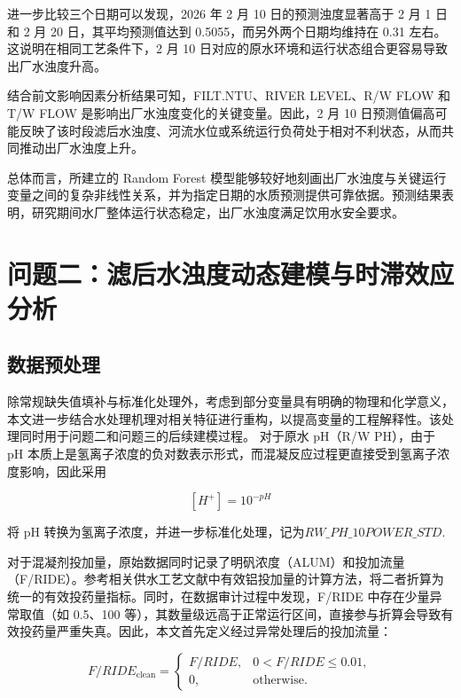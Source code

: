 \documentclass[UTF8,zihao=-4]{ctexart}
\begin{document}
进一步比较三个日期可以发现，2026 年 2 月 10 日的预测浊度显著高于 2 月 1 日和 2 月 20 日，其平均预测值达到 0.5055，而另外两个日期均维持在 0.31 左右。这说明在相同工艺条件下，2 月 10 日对应的原水环境和运行状态组合更容易导致出厂水浊度升高。

结合前文影响因素分析结果可知，FILT.NTU、RIVER LEVEL、R/W FLOW 和 T/W FLOW 是影响出厂水浊度变化的关键变量。因此，2 月 10 日预测值偏高可能反映了该时段滤后水浊度、河流水位或系统运行负荷处于相对不利状态，从而共同推动出厂水浊度上升。

总体而言，所建立的 Random Forest 模型能够较好地刻画出厂水浊度与关键运行变量之间的复杂非线性关系，并为指定日期的水质预测提供可靠依据。预测结果表明，研究期间水厂整体运行状态稳定，出厂水浊度满足饮用水安全要求。

\section{问题二：滤后水浊度动态建模与时滞效应分析}

\subsection{数据预处理}

除常规缺失值填补与标准化处理外，考虑到部分变量具有明确的物理和化学意义，本文进一步结合水处理机理对相关特征进行重构，以提高变量的工程解释性。该处理同时用于问题二和问题三的后续建模过程。
对于原水 pH（R/W PH），由于 pH 本质上是氢离子浓度的负对数表示形式，而混凝反应过程更直接受到氢离子浓度影响，因此采用

\[
[H^+]=10^{-pH}
\]

将 pH 转换为氢离子浓度，并进一步标准化处理，记为$RW\_PH\_{10POWER\_STD}$.



对于混凝剂投加量，原始数据同时记录了明矾浓度（ALUM）和投加流量（F/RIDE）。参考相关供水工艺文献中有效铝投加量的计算方法，将二者折算为统一的有效投药量指标。同时，在数据审计过程中发现，F/RIDE 中存在少量异常取值（如 0.5、100 等），其数量级远高于正常运行区间，直接参与折算会导致有效投药量严重失真。因此，本文首先定义经过异常处理后的投加流量：

\[
F/RIDE_{\mathrm{clean}}
=
\begin{cases}
F/RIDE, & 0<F/RIDE\le 0.01,\\
0, & \text{otherwise}.
\end{cases}
\]
\end{document}
